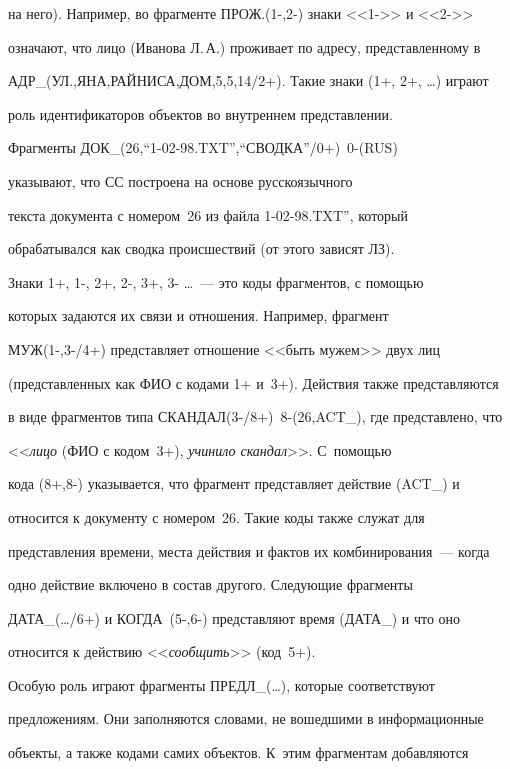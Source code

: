 на него). Например, во фрагменте ПРОЖ.(1-,2-) знаки <<1->> и <<2->> 


означают, что лицо (Иванова Л.\,А.) проживает по адресу, представленному в 


АДР\_(УЛ.,ЯНА,РАЙНИСА,ДОМ,5,5,14/2+). Такие знаки (1+, 2+, \ldots) играют 


роль идентификаторов объектов во внутреннем представлении. 


    


    Фрагменты ДОК\_(26,``1-02-98.TXT'',``СВОДКА''/0+)~0-(RUS) 


указывают, что СС построена на основе русскоязычного 


текста документа с номером~26 из файла 1-02-98.TXT'', который 


обрабатывался как сводка происшествий (от этого зависят ЛЗ). 


Знаки 1+, 1-, 2+, 2-, 3+, 3- \ldots~--- это коды фрагментов, с помощью 


которых задаются их связи и отношения. Например, фрагмент 


    МУЖ(1-,3-/4+) представляет отношение <<быть мужем>> двух лиц 


(представленных как ФИО с кодами 1+ и~3+). Действия также представляются 


в виде фрагментов типа СКАНДАЛ(3-/8+)~8-(26,ACT\_), где представлено, что 


<<\textit{лицо} (ФИО с кодом~3+), \textit{учинило скандал}>>. С~по\-мощью 


кода (8+,8-) указывается, что фрагмент представляет действие (ACT\_) и 


относится к документу с номером~26. Такие коды также служат для 


пред\-став\-ле\-ния времени, места действия и фактов их комбинирования~--- когда 


одно действие включено в состав другого. Следующие фрагменты 


ДАТА\_(\ldots/6+) и КОГДА~(5-,6-) представляют время (ДАТА\_) и что оно 


относится к действию <<\textit{сообщить}>> (код~5+).


    


    Особую роль играют фрагменты ПРЕДЛ\_(\ldots), которые соответствуют 


предложениям. Они заполняются словами, не вошедшими в информационные 


объекты, а также кодами самих объектов. К~этим фрагментам добавляются 


